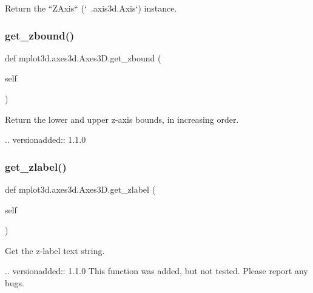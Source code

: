 \begin{DoxyVerb}Return the ``ZAxis`` (`~.axis3d.Axis`) instance.\end{DoxyVerb}
 \mbox{\label{classmplot3d_1_1axes3d_1_1Axes3D_a5d4d170245bd34e25ca95d4eb6bd33b8}} 
\subsubsection{\texorpdfstring{get\+\_\+zbound()}{get\_zbound()}}
{\footnotesize\ttfamily def mplot3d.\+axes3d.\+Axes3\+D.\+get\+\_\+zbound (\begin{DoxyParamCaption}\item[{}]{self }\end{DoxyParamCaption})}

\begin{DoxyVerb}Return the lower and upper z-axis bounds, in increasing order.

.. versionadded:: 1.1.0
\end{DoxyVerb}
 \mbox{\label{classmplot3d_1_1axes3d_1_1Axes3D_a9b5081e170ee8e955ef79f92b0c5ebac}} 
\subsubsection{\texorpdfstring{get\+\_\+zlabel()}{get\_zlabel()}}
{\footnotesize\ttfamily def mplot3d.\+axes3d.\+Axes3\+D.\+get\+\_\+zlabel (\begin{DoxyParamCaption}\item[{}]{self }\end{DoxyParamCaption})}

\begin{DoxyVerb}Get the z-label text string.

.. versionadded:: 1.1.0
    This function was added, but not tested. Please report any bugs.
\end{DoxyVerb}
 \mbox{\label{classmplot3d_1_1axes3d_1_1Axes3D_a23650e111f89635883df8adfbe7b5557}} 
